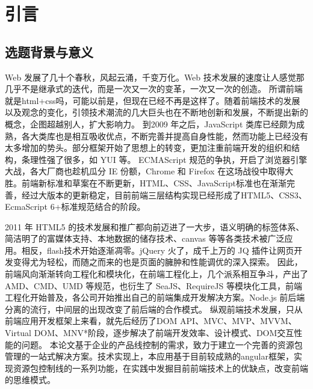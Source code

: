 
\chapter{引言}
\label{cha:introduction}
\section{选题背景与意义}
\label{sec:background}
Web 发展了几十个春秋，风起云涌，千变万化。Web 技术发展的速度让人感觉那几乎不是继承式的迭代，而是一次又一次的变革，一次又一次的创造。
所谓前端就是html+css吗，可能以前是，但现在已经不再是这样了。随着前端技术的发展以及观念的变化，引领技术潮流的几大巨头也在不断地创新和发展，不断提出新的概念，企图超越别人，扩大影响力。
到2009 年之后，JavaScript 类库已经颇为成熟，各大类库也是相互吸收优点，不断完善并提高自身性能，然而功能上已经没有太多增加的势头。部分框架开始了思想上的转变，更加注重前端开发的组织和结构，条理性强了很多，如 YUI 等。
ECMAScript 规范的争执，开启了浏览器引擎大战，各大厂商也趁机瓜分 IE 份额，Chrome 和 Firefox 在这场战役中取得大胜。前端新标准和草案在不断更新，HTML、CSS、JavaScript标准也在渐渐完善，经过大版本的更新稳定，目前前端三层结构实现已经形成了HTML5、CSS3、EcmaScript 6+标准规范结合的阶段。

2011 年 HTML5 的技术发展和推广都向前迈进了一大步，语义明确的标签体系、简洁明了的富媒体支持、本地数据的储存技术、canvas 等等各类技术被广泛应用。相反，flash技术开始逐渐凋零。jQuery 火了，成千上万的 JQ 插件让网页开发变得尤为轻松，而随之而来的也是页面的臃肿和性能调优的深入探索。
因此，前端风向渐渐转向工程化和模块化，在前端工程化上，几个派系相互争斗，产出了 AMD、CMD、UMD 等规范，也衍生了 SeaJS、RequireJS 等模块化工具，前端工程化开始普及，各公司开始推出自己的前端集成开发解决方案。Node.js 前后端分离的流行，中间层的出现改变了前后端的合作模式。
纵观前端技术发展，只从前端应用开发框架上来看，就先后经历了DOM API、MVC、MVP、MVVM、Virtual DOM、MNV*阶段，逐步解决了前端开发效率、设计模式、DOM交互性能的问题。
本论文基于企业的产品线控制的需求，致力于建立一个完善的资源包管理的一站式解决方案。技术实现上，本应用基于目前较成熟的angular框架，实现资源包控制线的一系列功能，在实践中发掘目前前端技术上的优缺点，改变前端的思维模式。
